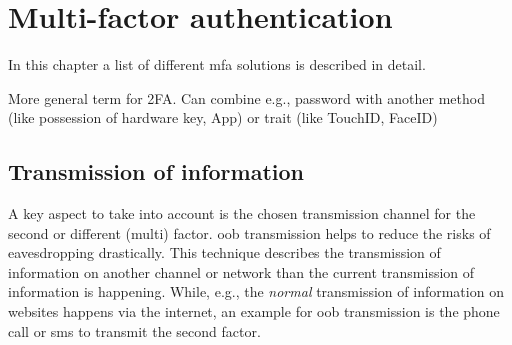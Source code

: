 \chapter{Multi-factor authentication}

In this chapter a list of different \gls{mfa} solutions is described in detail.
\cite{9781849287333}

More general term for 2FA. Can combine e.g., password with another method (like possession of hardware key, App) or trait (like TouchID, FaceID)

\section{Transmission of information}

A key aspect to take into account is the chosen transmission channel for the second or different (multi) factor. \gls{oob} transmission helps to reduce the risks of eavesdropping drastically. This technique describes the transmission of information on another channel or network than the current transmission of information is happening. While, e.g., the \textit{normal} transmission of information on websites happens via the internet, an  example for \gls{oob} transmission is the phone call or \gls{sms} to transmit the second factor. 